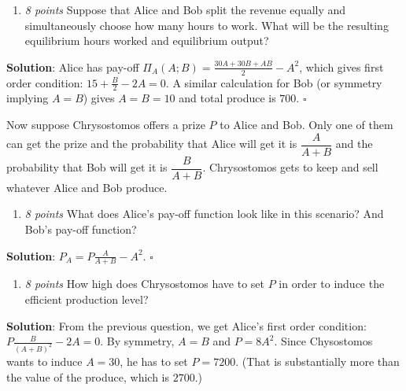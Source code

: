 \documentclass{article}
\begin{document}
\begin{enumerate}[resume*]
\item \textit{8 points }Suppose that Alice and Bob split the revenue equally and simultaneously choose how many hours to work. What will be the resulting equilibrium hours worked and equilibrium output?\end{enumerate}
\textbf{Solution}:
Alice has pay-off $\Pi_{A}(A;B)=\frac{30A+30B+AB}2-A^{2}$, which gives first order condition: $15+\frac B2-2A=0$. A similar calculation for Bob (or symmetry implying $A=B$) gives $A=B=10$ and total produce is $700$. $\square$

Now suppose Chrysostomos offers a prize $P$ to Alice and Bob. Only one of them can get the prize and the probability that Alice will get it is $\dfrac{A}{A+B}$ and the probability that Bob will get it is $\dfrac B{A+B}$. Chrysostomos gets to keep and sell whatever Alice and Bob produce.

\begin{enumerate}[resume*]
  \item \textit{8 points }What does Alice's pay-off function look like in this scenario? And Bob's pay-off function?\end{enumerate}
  \textbf{Solution}:
  $P_{A}=P\frac A{A+B} -A^{2}$. $\square$

\begin{enumerate}[resume*]
  \item \textit{8 points }How high does Chrysostomos have to set $P$ in order to induce the efficient production level?\end{enumerate}
\textbf{Solution}:
From the previous question, we get Alice's first order condition: $P\frac B{(A+B)^{2}}-2A=0$. By symmetry, $A=B$ and $P=8A^{2}$. Since Chysostomos wants to induce $A=30$, he has to set $P=7200$. (That is substantially more than the value of the produce, which is $2700$.)
\end{document}
